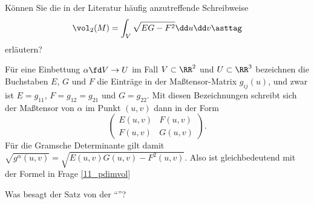 \begin{frage}
  Können Sie die in der Literatur häufig anzutreffende Schreibweise 
  \[
  \vol_2(M) = \int_V \sqrt{EG-F^2} \dd u \dd v \asttag
  \]
  erläutern?
\end{frage}

\begin{antwort}
  Für eine Einbettung $\alpha \fd V\to U$ 
  im Fall $V\subset\RR^2$ und $U\subset\RR^3$ bezeichnen die Buchstaben 
  $E$, $G$ und $F$ die Einträge in der Maßtensor-Matrix $g_{ij}(u)$, 
  und zwar ist $E=g_{11}$, $F=g_{12}=g_{21}$ und $G=g_{22}$. Mit diesen 
  Bezeichnungen schreibt sich der Maßtensor von $\alpha$ im Punkt $(u,v)$ 
  dann in der Form
  \[
  \begin{pmatrix} E(u,v) & F(u,v) 
    \\ F(u,v) & G(u,v) \end{pmatrix}.
  \]
  Für die Gramsche Determinante gilt damit
  $\sqrt{g^\alpha(u,v)}=\sqrt{ E(u,v)G(u,v) -F^2(u,v) }$. 
  Also ist {\astref} gleichbedeutend mit der Formel in Frage 
  \ref{11_pdimvol}\AntEnd 
\end{antwort}



\begin{frage}
  Was besagt der Satz von der "`"'? 
\end{frage}

